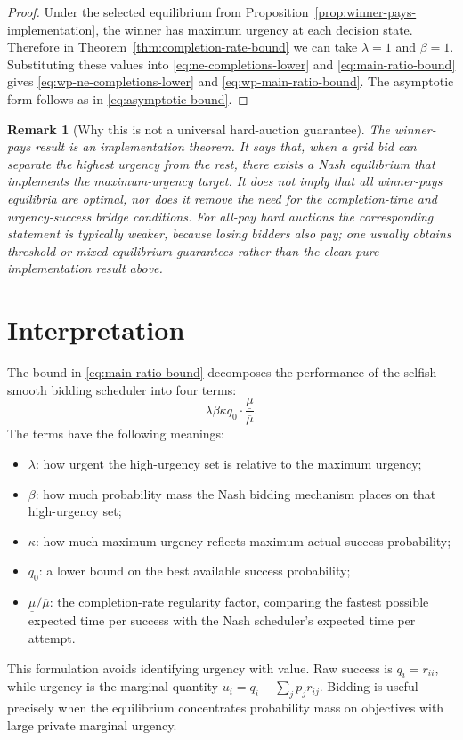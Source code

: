 \documentclass[11pt]{article}
\newtheorem{remark}{Remark}
\begin{document}
\begin{proof}
Under the selected equilibrium from Proposition~\ref{prop:winner-pays-implementation}, the winner has maximum urgency
at each decision state. Therefore in Theorem~\ref{thm:completion-rate-bound} we can take $\lambda=1$ and $\beta=1$.
Substituting these values into \eqref{eq:ne-completions-lower} and \eqref{eq:main-ratio-bound} gives
\eqref{eq:wp-ne-completions-lower} and \eqref{eq:wp-main-ratio-bound}. The asymptotic form follows as in
\eqref{eq:asymptotic-bound}.
\end{proof}

\begin{remark}[Why this is not a universal hard-auction guarantee]
The winner-pays result is an implementation theorem. It says that, when a grid bid can separate the highest urgency
from the rest, there exists a Nash equilibrium that implements the maximum-urgency target. It does not imply that all
winner-pays equilibria are optimal, nor does it remove the need for the completion-time and urgency-success bridge
conditions. For all-pay hard auctions the corresponding statement is typically weaker, because losing bidders also
pay; one usually obtains threshold or mixed-equilibrium guarantees rather than the clean pure implementation result
above.
\end{remark}

\section{Interpretation}

The bound in \eqref{eq:main-ratio-bound} decomposes the performance of the selfish smooth bidding scheduler into four
terms:
\begin{equation}
  \lambda\beta\kappa q_0\cdot \frac{\underline\mu}{\overline\mu}.
  \label{eq:factor-decomposition}
\end{equation}
The terms have the following meanings:
\begin{itemize}[leftmargin=2em]
  \item $\lambda$: how urgent the high-urgency set is relative to the maximum urgency;
  \item $\beta$: how much probability mass the Nash bidding mechanism places on that high-urgency set;
  \item $\kappa$: how much maximum urgency reflects maximum actual success probability;
  \item $q_0$: a lower bound on the best available success probability;
  \item $\underline\mu/\overline\mu$: the completion-rate regularity factor, comparing the fastest possible expected time per success with the Nash scheduler's expected time per attempt.
\end{itemize}
This formulation avoids identifying urgency with value. Raw success is $q_i=r_{ii}$, while urgency is the marginal
quantity $u_i=q_i-\sum_jp_jr_{ij}$. Bidding is useful precisely when the equilibrium concentrates probability mass on
objectives with large private marginal urgency.
\end{document}
